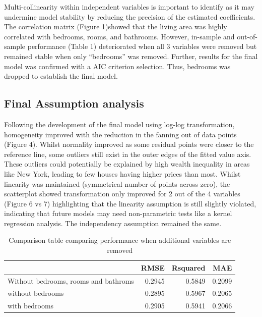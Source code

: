 \documentclass[letterpaper,8pt,twocolumn,twoside,]{pinp}
\begin{document}
Multi-collinearity within independent variables is important to identify
as it may undermine model stability by reducing the precision of the
estimated coefficients. The correlation matrix (Figure 1)showed that the
living area was highly correlated with bedrooms, rooms, and bathrooms.
However, in-sample and out-of-sample performance (Table 1) deteriorated
when all 3 variables were removed but remained stable when only
``bedrooms'' was removed. Further, results for the final model was
confirmed with a AIC criterion selection. Thus, bedrooms was dropped to
establish the final model.

\subsection{Final Assumption analysis}\label{final-assumption-analysis}

Following the development of the final model using log-log
transformation, homogeneity improved with the reduction in the fanning
out of data points (Figure 4). Whilst normality improved as some
residual points were closer to the reference line, some outliers still
exist in the outer edges of the fitted value axis. These outliers could
potentially be explained by high wealth inequality in areas like New
York, leading to few houses having higher prices than most. Whilst
linearity was maintained (symmetrical number of points across zero), the
scatterplot showed transformation only improved for 2 out of the 4
variables (Figure 6 vs 7) highlighting that the linearity assumption is
still slightly violated, indicating that future models may need
non-parametric tests like a kernel regression analysis. The independency
assumption remained the same.

\begin{table}[H]

\caption{\label{tab:unnamed-chunk-3}Comparison table comparing performance when additional variables are removed}
\centering
\begin{tabular}[t]{l|r|r|r}
\hline
  & RMSE & Rsquared & MAE\\
\hline
Without bedrooms, rooms and bathroms & 0.2945 & 0.5849 & 0.2099\\
\hline
without bedrooms & 0.2895 & 0.5967 & 0.2065\\
\hline
with bedrooms & 0.2905 & 0.5941 & 0.2066\\
\hline
\end{tabular}
\end{table}
\end{document}
